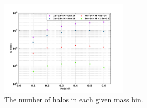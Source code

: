 \begin{figure}
 \centering  %
  \includegraphics[width=0.55\textwidth]{fig/Halo_N.pdf} 
  \caption{The number of halos in each given mass bin.}
\label{fig:N_Halo}
\end{figure} 